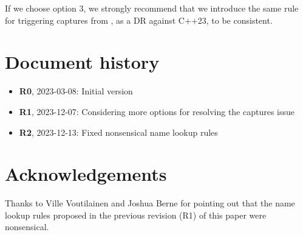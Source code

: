 If we choose option 3, we strongly recommend that we introduce the same rule for triggering captures from \tcode{[[assume(x)]]}, as a DR against C++23, to be consistent.

\section*{Document history}

\begin{itemize}
\item \textbf{R0}, 2023-03-08: Initial version
\item \textbf{R1}, 2023-12-07: Considering more options for resolving the captures issue
\item \textbf{R2}, 2023-12-13: Fixed nonsensical name lookup rules
\end{itemize}

\section*{Acknowledgements}

Thanks to Ville Voutilainen and Joshua Berne for pointing out that the name lookup rules proposed in the previous revision (R1) of this paper were  nonsensical.

\renewcommand{\bibname}{References}





